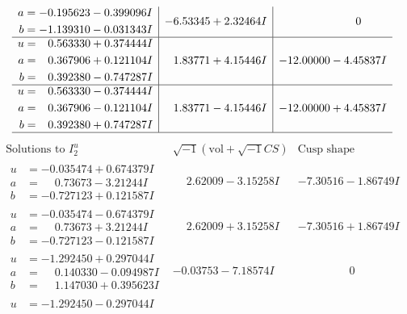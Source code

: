 \documentclass[1p]{elsarticle_modified}
\theoremstyle{definition}
\newcommand{\I}{\sqrt{-1}}
\begin{document}
$$\begin{array}{c|c|c}
\begin{aligned}
a &= -0.195623 - 0.399096 I \\
b &= -1.139310 - 0.031343 I\end{aligned}
 & -6.53345 + 2.32464 I & \phantom{-0.000000 } 0 \\ \hline\begin{aligned}
u &= \phantom{-}0.563330 + 0.374444 I \\
a &= \phantom{-}0.367906 + 0.121104 I \\
b &= \phantom{-}0.392380 - 0.747287 I\end{aligned}
 & \phantom{-}1.83771 + 4.15446 I & -12.00000 - 4.45837 I \\ \hline\begin{aligned}
u &= \phantom{-}0.563330 - 0.374444 I \\
a &= \phantom{-}0.367906 - 0.121104 I \\
b &= \phantom{-}0.392380 + 0.747287 I\end{aligned}
 & \phantom{-}1.83771 - 4.15446 I & -12.00000 + 4.45837 I\\
 \hline 
 \end{array}$$\newpage$$\begin{array}{c|c|c}  
\text{Solutions to }I^u_{2}& \I (\text{vol} + \sqrt{-1}CS) & \text{Cusp shape}\\
 \hline 
\begin{aligned}
u &= -0.035474 + 0.674379 I \\
a &= \phantom{-}0.73673 - 3.21244 I \\
b &= -0.727123 + 0.121587 I\end{aligned}
 & \phantom{-}2.62009 - 3.15258 I & -7.30516 - 1.86749 I \\ \hline\begin{aligned}
u &= -0.035474 - 0.674379 I \\
a &= \phantom{-}0.73673 + 3.21244 I \\
b &= -0.727123 - 0.121587 I\end{aligned}
 & \phantom{-}2.62009 + 3.15258 I & -7.30516 + 1.86749 I \\ \hline\begin{aligned}
u &= -1.292450 + 0.297044 I \\
a &= \phantom{-}0.140330 - 0.094987 I \\
b &= \phantom{-}1.147030 + 0.395623 I\end{aligned}
 & -0.03753 - 7.18574 I & \phantom{-0.000000 } 0 \\ \hline\begin{aligned}
u &= -1.292450 - 0.297044 I \\

\end{aligned}
\end{array}$$
\end{document}
